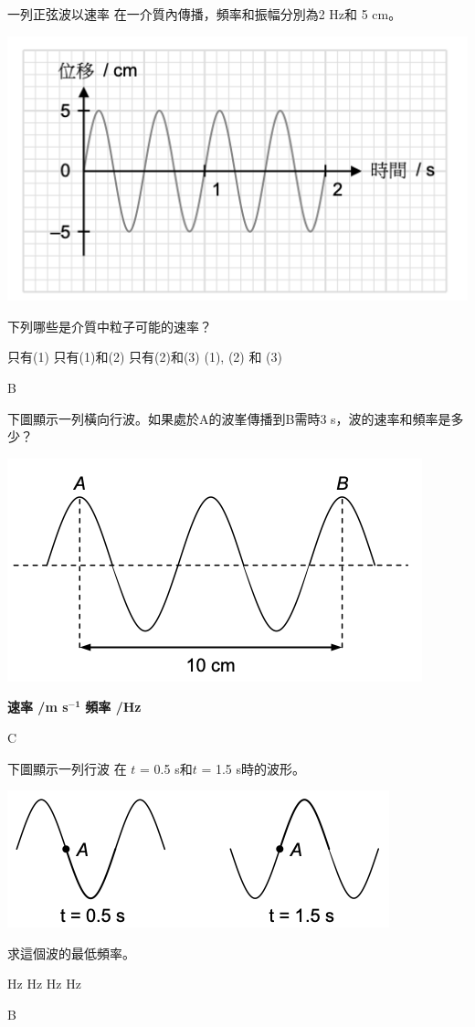 {
    一列正弦波以速率 在一介質內傳播，頻率和振幅分別為2 Hz和 5 cm。
    \par{\par\centering\includegraphics[width=.4\textwidth]{./img/ch1_earlyclass_wave_mc_2024-05-13-16-04-17.png}\par}
    下列哪些是介質中粒子可能的速率？
    \begin{statements}
        \task {}
        \task {}
    \end{statements}
    \begin{tasks}
        \task 只有(1)
        \task 只有(1)和(2)
        \task 只有(2)和(3)
        \task (1), (2) 和 (3)
    \end{tasks}
}{\mckey B}

{
    下圖顯示一列橫向行波。如果處於A的波峯傳播到B需時3 s，波的速率和頻率是多少？
    \par{\par\centering\includegraphics[width=.4\textwidth]{./img/ch1_earlyclass_wave_mc_2024-05-13-16-05-45.png}\par}
    \begin{tasks}
        \task [] \textbf{速率 /m s}$\mathbf{^{-1}}$ \tab\tab \textbf{頻率 /Hz}
         \tab{}
         \tab{}
         \tab{}
         \tab{}
    \end{tasks}

}{\mckey C}

{
    下圖顯示一列行波 在 $t$ = 0.5 s和$t$ = 1.5 s時的波形。
    \par{\par\centering\includegraphics[width=.4\textwidth]{./img/ch1_earlyclass_wave_mc_2024-05-13-16-11-35.png}\par}
    求這個波的最低頻率。
    \begin{tasks}
         Hz
         Hz
         Hz
         Hz
    \end{tasks}

}{\mckey B}

